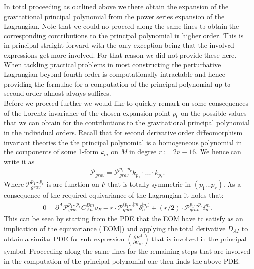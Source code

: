 \documentclass[a4paper,12pt, DIV=14, BCOR=5mm, twoside, headsepline]{scrbook}
\begin{document}
In total proceeding as outlined above we there obtain the expansion of the gravitational principal polynomial from the power series expansion of the Lagrangian.
Note that we could no proceed along the same lines to obtain the corresponding contributions to the principal polynomial in higher order. This is in principal straight forward with the only exception being that the involved expressions get more involved. For that reason we did not provide these here. When tackling practical problems in most constructing the perturbative Lagrangian beyond fourth order is computationally intractable and hence providing the formulae for a computation of the principal polynomial up to second order almost always suffices.\\
Before we proceed further we would like to quickly remark on some consequences of the Lorentz invariance of the chosen expansion point $p_0$ on the possible values that we can obtain for the contributions to the gravitational principal polynomial in the individual orders. Recall that for second derivative order diffeomorphism invariant theories the the principal polynomial is a homogeneous polynomial in the components of some 1-form $k_m$ on $M$ in degree $r := 2n-16$. We hence can write it as 
\begin{align}
    \mathcal{P}_{grav} = \mathcal{P}_{grav}^{{p_1}...{p_{r}}} k_{p_1} \cdot ... \cdot k_{p_r}.
\end{align}
Where $\mathcal{P}_{grav}^{{p_1}...{p_r}}$ is are function on $F$ that is totally symmetric in $(p_1...p_r)$. As a consequence of the required equivariance of the Lagrangian it holds that:
\begin{align}\label{polyEqn}
    0 = \partial^A\mathcal{P}_{grav}^{{p_1}...{p_r}}C_{An}^{Bm}v_B - r \cdot \mathcal{P}_{grav}^{({p_1}...\vert m} \delta_{n}^{\vert p_r) }  + (r/2) \cdot \mathcal{P}_{grav}^{{p_1}...{p_r}} \delta^m_n.
\end{align}
%
%
%
This can be seen by starting from the PDE that the EOM have to satisfy as an implication of the equivariance (\ref{EOM}) and applying the total derivative $D_{AI}$ to obtain a similar PDE for sub expression $\left ( \frac{\partial E^A}{\partial V_{BI}} \right )$ that is involved in the principal symbol. Proceeding along the same lines for the remaining steps that are involved in the computation of the principal polynomial one then finds the above PDE. \\
\end{document}
